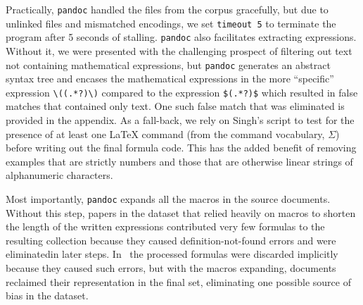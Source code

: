 \documentclass{article}
\begin{document}
Practically, \texttt{pandoc} handled the files from the corpus gracefully, but
due to unlinked files and mismatched encodings, we set \texttt{timeout 5} to
terminate the program after 5 seconds of stalling. \texttt{pandoc} also
facilitates extracting expressions. Without it, we were presented with the
challenging prospect of filtering out text not containing mathematical
expressions, but \texttt{pandoc} generates an abstract syntax tree and encases
the mathematical expressions in the more ``specific'' expression
\verb|\((.*?)\)| compared to the expression \texttt{\$(.*?)\$} which resulted in
false matches that contained only text. One such false match that was eliminated
is provided in the appendix. As a fall-back, we rely on Singh's script to test
for the presence of at least one \LaTeX{} command (from the command vocabulary,
$\Sigma$) before writing out the final formula code. This has the added benefit
of removing examples that are strictly numbers and those that are otherwise
linear strings of alphanumeric characters.

Most importantly, \texttt{pandoc} expands all the macros in the source
documents. Without this step, papers in the dataset that relied heavily on
macros to shorten the length of the written expressions contributed very few
formulas to the resulting collection because they caused definition-not-found
errors and were eliminatedin later steps. In~\cite{deng2016you} the processed
formulas were discarded implicitly because they caused such errors, but with the
macros expanding, documents reclaimed their representation in the final set,
eliminating one possible source of bias in the dataset.
\end{document}
